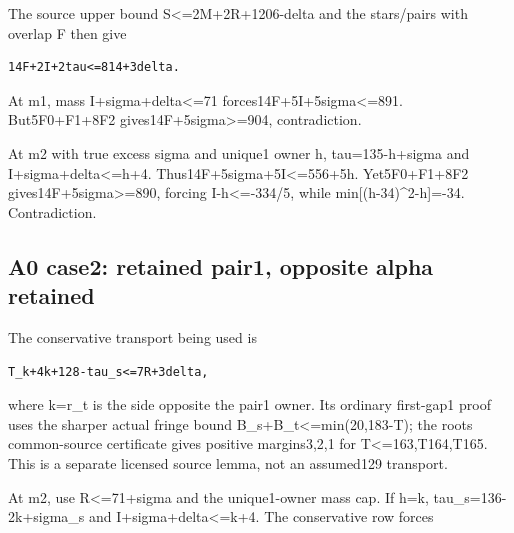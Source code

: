 \documentclass[10pt,a4paper]{article}
\theoremstyle{definition}
\begin{document}
The source upper bound S\textless=\allowbreak{}2M+\allowbreak{}2R+\allowbreak{}1206-delta and the stars/pairs
with overlap F then give

\begin{lstlisting}
14F+2I+2tau<=814+3delta.
\end{lstlisting}

At m1,\allowbreak{} mass I+\allowbreak{}sigma+\allowbreak{}delta\textless=\allowbreak{}71 forces14F+\allowbreak{}5I+\allowbreak{}5sigma\textless=\allowbreak{}891.
But5F0+\allowbreak{}F1+\allowbreak{}8F2 gives14F+\allowbreak{}5sigma\textgreater=\allowbreak{}904,\allowbreak{} contradiction.

At m2 with true excess sigma\textquotesingle{} and unique1 owner h,\allowbreak{}
tau=\allowbreak{}135-h+\allowbreak{}sigma\textquotesingle{} and
I+\allowbreak{}sigma\textquotesingle+\allowbreak{}delta\textless=\allowbreak{}h+\allowbreak{}4.
Thus14F+\allowbreak{}5sigma\textquotesingle+\allowbreak{}5I\textless=\allowbreak{}556+\allowbreak{}5h. Yet5F0+\allowbreak{}F1+\allowbreak{}8F2
gives14F+\allowbreak{}5sigma\textquotesingle\textgreater=\allowbreak{}890,\allowbreak{} forcing
I-h\textless=\allowbreak{}-334/5,\allowbreak{} while min{[}(h-34)\^{}2-h{]}=\allowbreak{}-34. Contradiction.

\hypertarget{a0-case2-retained-pair1-opposite-alpha-retained}{%
\subsection{A0 case2: retained pair1,\allowbreak{} opposite alpha
retained}\label{a0-case2-retained-pair1-opposite-alpha-retained}}

The conservative transport being used is

\begin{lstlisting}
T_k+4k+128-tau_s<=7R+3delta,
\end{lstlisting}

where k=\allowbreak{}r\_\allowbreak{}t is the side opposite the pair1 owner. Its ordinary
first-gap1 proof uses the sharper actual fringe bound
B\_\allowbreak{}s+\allowbreak{}B\_\allowbreak{}t\textless=\allowbreak{}min(20,\allowbreak{}183-T); the root\textquotesingle s
common-source certificate gives positive margins3,\allowbreak{}2,\allowbreak{}1 for
T\textless=\allowbreak{}163,\allowbreak{}T164,\allowbreak{}T165. This is a separate licensed source lemma,\allowbreak{} not
an assumed129 transport.

At m2,\allowbreak{} use R\textless=\allowbreak{}71+\allowbreak{}sigma\textquotesingle{} and the unique1-owner
mass cap. If h=\allowbreak{}k,\allowbreak{} tau\_\allowbreak{}s=\allowbreak{}136-2k+\allowbreak{}sigma\_\allowbreak{}s and
I+\allowbreak{}sigma\textquotesingle+\allowbreak{}delta\textless=\allowbreak{}k+\allowbreak{}4. The conservative row forces
\end{document}

